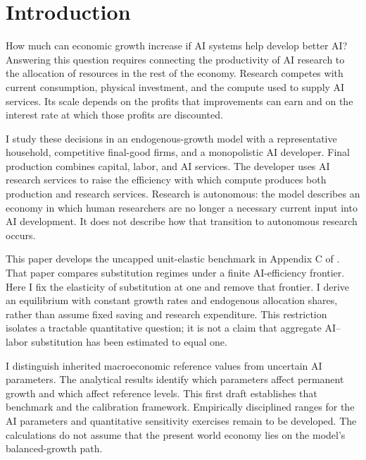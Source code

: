 \section{Introduction}
\label{sec:companion-introduction}

How much can economic growth increase if AI systems help develop better AI?
Answering this question requires connecting the productivity of AI research
to the allocation of resources in the rest of the economy. Research competes
with current consumption, physical investment, and the compute used to supply
AI services. Its scale depends on the profits that improvements can earn and
on the interest rate at which those profits are discounted.

I study these decisions in an endogenous-growth model with a representative
household, competitive final-good firms, and a monopolistic AI developer.
Final production combines capital, labor, and AI services. The developer
uses AI research services to raise the efficiency with which compute produces
both production and research services. Research is autonomous: the model
describes an economy in which human researchers are no longer a necessary
current input into AI development. It does not describe how that transition
to autonomous research occurs.

This paper develops the uncapped unit-elastic benchmark in Appendix C of
\citet{pardo2026future}. That paper compares substitution regimes under a
finite AI-efficiency frontier. Here I fix the elasticity of substitution at
one and remove that frontier. I derive an equilibrium with constant growth
rates and endogenous allocation shares, rather than assume fixed saving and
research expenditure. This restriction isolates a tractable quantitative
question; it is not a claim that aggregate AI--labor substitution has been
estimated to equal one.

I distinguish inherited macroeconomic reference values from uncertain AI
parameters. The analytical results identify which parameters affect permanent
growth and which affect reference levels. This first draft establishes that
benchmark and the calibration framework. Empirically disciplined ranges for
the AI parameters and quantitative sensitivity exercises remain to be developed.
The calculations do not assume that the present world economy lies on the
model's balanced-growth path.
